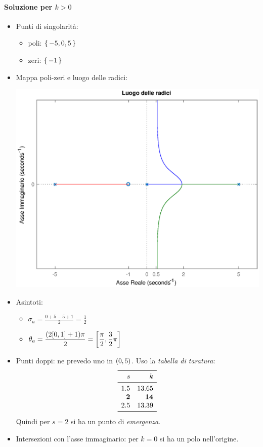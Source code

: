 \paragraph{Soluzione per \(k>0\)}
\begin{itemize}
	\item Punti di singolarità: \begin{itemize}
		\item poli: \(\set{-5,0,5}\)
		\item zeri: \(\set{-1}\)
	\end{itemize}
	\item Mappa poli-zeri e luogo delle radici:
		\begin{center}\includegraphics[scale=.5]{mod1/assets/rl_ex316.eps}\end{center}
	\item Asintoti: \begin{itemize}
		\item \(\displaystyle \sigma_a = \frac{0+5-5+1}{2} = \frac{1}{2}\)
		\item \(\displaystyle \theta_a = \frac{\qty(2\qty[0,1]+1)\pi}{2} = \qty[\frac{\pi}{2},\frac{3}{2}\pi]\)
	\end{itemize}
	\item Punti doppi: ne prevedo uno in \(\qty(0,5)\). Uso la \emph{tabella di taratura}:
		\[\begin{array}{rr}
			\toprule
			s & k \\
			\midrule
			1.5 & 13.65 \\
			\bm{2} & \bm{14} \\
			2.5 & 13.39 \\
			\bottomrule
		\end{array}\]
		Quindi per \(s=2\) si ha un punto di \emph{emergenza}.
	\item Intersezioni con l'asse immaginario: per \(k=0\) si ha un polo nell'origine.
\end{itemize}

